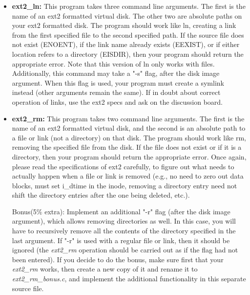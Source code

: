 \documentclass[12pt]{article}
\begin{document}
\begin{itemize}
    \item \textbf{ext2\_ln:} This program takes three command line arguments. The
    first is the name of an ext2 formatted virtual disk. The other two are absolute
    paths on your ext2 formatted disk. The program should work like ln, creating
    a link from the first specified file to the second specified path. If the
    source file does not exist (ENOENT), if the link name already exists
    (EEXIST), or if either location refers to a directory (EISDIR), then your
    program should return the appropriate error. Note that this version of ln
    only works with files. Additionally, this command may take a "-s" flag,
    after the disk image argument. When this flag is used, your program must
    create a symlink instead (other arguments remain the same). If in doubt
    about correct operation of links, use the ext2 specs and ask on the discussion
    board.

    \item \textbf{ext2\_rm:} This program takes two command line arguments. The
    first is the name of an ext2 formatted virtual disk, and the second is an
    absolute path to a file or link (not a directory) on that disk. The program
    should work like rm, removing the specified file from the disk. If the file
    does not exist or if it is a directory, then your program should return the
    appropriate error. Once again, please read the specifications of ext2
    carefully, to figure out what needs to actually happen when a file or link
    is removed (e.g., no need to zero out data blocks, must set i\_dtime in the
    inode, removing a directory entry need not shift the directory entries after
    the one being deleted, etc.).

    \bigskip

    Bonus(5\% extra): Implement an additional "-r" flag (after the disk image argument),
    which allows removing directories as well. In this case, you will have to recursively
    remove all the contents of the directory specified in the last argument. If "-r" is
    used with a regular file or link, then it should be ignored (the \textit{ext2\_rm}
    operation should be carried out as if the flag had not been entered). If you
    decide to do the bonus, make sure first that your \textit{ext2\_rm} works, then create
    a new copy of it and rename it to \textit{ext2\_rm\_bonus.c}, and implement the
    additional functionality in this separate source file.
\end{itemize}
\end{document}
